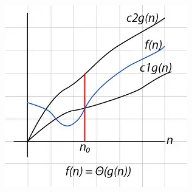 \begin{frame}
\begin{columns}
    \begin{column}{0.3\textwidth}
      \includegraphics[width=\textwidth]{figures/MasterTheorem/theta.jpg}
    \end{column}
  \end{columns}
\end{frame}

